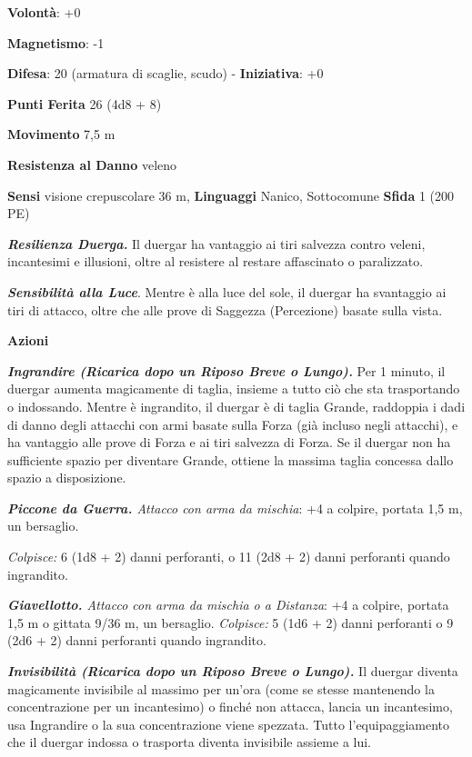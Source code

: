 \begin{multicols}{2}
\textbf{Volontà}: +0

\textbf{Magnetismo}: -1

\textbf{Difesa}: 20 (armatura di scaglie, scudo) - \textbf{Iniziativa}: +0

\textbf{Punti Ferita} 26 (4d8 + 8)

\textbf{Movimento} 7,5 m

\textbf{Resistenza al Danno} veleno

\textbf{Sensi} visione crepuscolare 36 m, 
\textbf{Linguaggi} Nanico, Sottocomune \textbf{Sfida} 1 (200 PE)

\emph{\textbf{Resilienza Duerga.}} Il duergar ha vantaggio ai tiri
salvezza contro veleni, incantesimi e illusioni, oltre al resistere al
restare affascinato o paralizzato.

\emph{\textbf{Sensibilità alla Luce}}. Mentre è alla luce del sole, il
duergar ha svantaggio ai tiri di attacco, oltre che alle prove di
Saggezza (Percezione) basate sulla vista.

\textbf{Azioni}

\emph{\textbf{Ingrandire (Ricarica dopo un Riposo Breve o Lungo).}} Per
1 minuto, il duergar aumenta magicamente di taglia, insieme a tutto ciò
che sta trasportando o indossando. Mentre è ingrandito, il duergar è di
taglia Grande, raddoppia i dadi di danno degli attacchi con armi basate
sulla Forza (già incluso negli attacchi), e ha vantaggio alle prove di
Forza e ai tiri salvezza di Forza. Se il duergar non ha sufficiente
spazio per diventare Grande, ottiene la massima taglia concessa dallo
spazio a disposizione.

\emph{\textbf{Piccone da Guerra.} Attacco con arma da mischia}: +4 a
colpire, portata 1,5 m, un bersaglio.

\emph{Colpisce:} 6 (1d8 + 2) danni perforanti, o 11 (2d8 + 2) danni
perforanti quando ingrandito.

\emph{\textbf{Giavellotto.} Attacco con arma da mischia o a Distanza}:
+4 a colpire, portata 1,5 m o gittata 9/36 m, un bersaglio.
\emph{Colpisce:} 5 (1d6 + 2) danni perforanti o 9 (2d6 + 2) danni
perforanti quando ingrandito.

\emph{\textbf{Invisibilità (Ricarica dopo un Riposo Breve o Lungo).}} Il
duergar diventa magicamente invisibile al massimo per un'ora (come se
stesse mantenendo la concentrazione per un incantesimo) o finché non
attacca, lancia un incantesimo, usa Ingrandire o la sua concentrazione
viene spezzata. Tutto l'equipaggiamento che il duergar indossa o
trasporta diventa invisibile assieme a lui.


\end{multicols}

